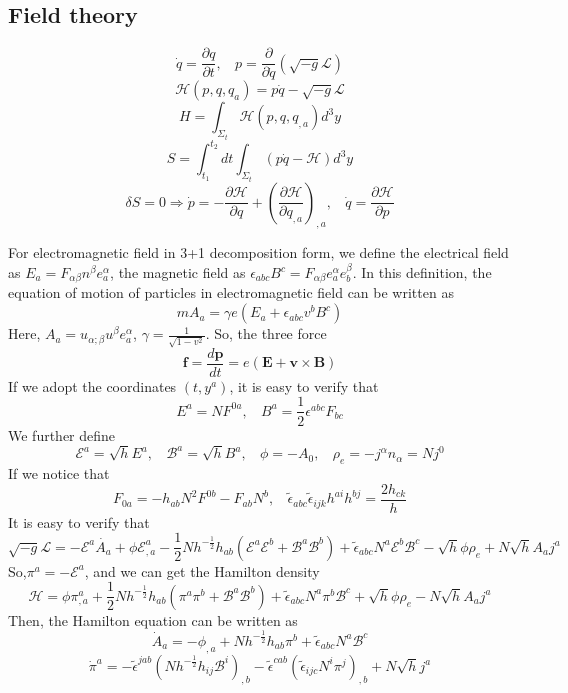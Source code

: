 \subsection{Field theory}
\[\dot{q} = \frac{\partial q}{\partial t}, \ \ \ \ p=\frac{\partial}{\partial \dot{q}}(\sqrt{-g} \mathcal{L})\]
\[\mathcal{H}(p,q,q_a) = p\dot{q} - \sqrt{-g} \mathcal{L}\]
\[H = \int_{\Sigma_t} \mathcal{H}(p,q,q_{,a})d^3y\]
\[S = \int_{t_1}^{t_2} dt \int_{\Sigma_t} (p \dot{q} - \mathcal{H} ) d^3 y\]
\[\delta S = 0 \Rightarrow \dot{p} = -\frac{\partial \mathcal{H}}{\partial q} + \left(\frac{\partial \mathcal{H}}{\partial q_{,a}}\right)_{,a}, \ \ \ \ \dot{q} = \frac{\partial \mathcal{H}}{\partial p}\]
\begin{example}
For electromagnetic field in 3+1 decomposition form, we define the electrical field as $E_a = F_{\alpha \beta} n^{\beta} e_a^{\alpha}$, the magnetic field as $\epsilon_{abc} B^c = F_{\alpha \beta} e_a^{\alpha} e_b^{\beta}$. In this definition, the equation of motion of particles in electromagnetic field can be written as
\[m A_a = \gamma e (E_a + \epsilon_{abc} v^b B^c)\]
Here, $A_a = u_{\alpha;\beta} u^{\beta} e_a^{\alpha}$, $\gamma = \frac{1}{\sqrt{1-v^2}}$. So, the three force
\[\bm {f}=\frac{d\bm {p}}{dt} = e(\bm {E} + \bm {v} \times \bm {B})\]
If we adopt the coordinates $(t,y^a)$, it is easy to verify that
\[E^a = N F^{0a}, \ \ \ \ B^a = \frac{1}{2} \epsilon^{abc} F_{bc}\]
We further define
\[\mathcal{E}^a = \sqrt{h} E^a, \ \ \ \ \mathcal{B}^a = \sqrt{h} B^a, \ \ \ \ \phi = - A_0, \ \ \ \ \rho_{e} = -j^{\alpha} n_{\alpha} = N j^0\]
If we notice that
\[F_{0a} = -h_{ab}N^2F^{0b} - F_{ab}N^b, \ \ \ \ \tilde{\epsilon}_{abc} \tilde{\epsilon}_{ijk} h^{ai} h^{bj} = \frac{2h_{ck}}{h}\]
It is easy to verify that
\[ \sqrt{-g} \mathcal{L} = - \mathcal{E}^a \dot{A_a} + \phi \mathcal{E}^a_{,a} - \frac{1}{2} N h^{-\frac{1}{2}} h_{ab} (\mathcal{E}^a \mathcal{E}^b + \mathcal{B}^a \mathcal{B}^b) + \tilde{\epsilon}_{abc}N^a \mathcal{E}^b \mathcal{B}^c -\sqrt{h} \phi \rho_e + N \sqrt{h} A_a j^a\]
So,$\pi^a = -\mathcal{E}^a$, and we can get the Hamilton density
\[\mathcal{H} = \phi \pi^a_{,a} + \frac{1}{2} N h^{-\frac{1}{2}} h_{ab} (\pi^a \pi^b + \mathcal{B}^a \mathcal{B}^b) + \tilde{\epsilon}_{abc}N^a \pi^b \mathcal{B}^c +\sqrt{h} \phi \rho_e - N \sqrt{h} A_a j^a\]
Then, the Hamilton equation can be written as
\[\dot{A}_a = -\phi_{,a} + N h^{-\frac{1}{2}} h_{ab}\pi^b + \tilde{\epsilon}_{abc}N^a \mathcal{B}^c\]
\[\dot{\pi}^a = - \tilde{\epsilon}^{jab}(Nh^{-\frac{1}{2}}h_{ij}\mathcal{B}^i)_{,b} - \tilde{\epsilon}^{cab}(\tilde{\epsilon}_{ijc}N^i \pi^j)_{,b} + N\sqrt{h}j^a \]

\end{example}
